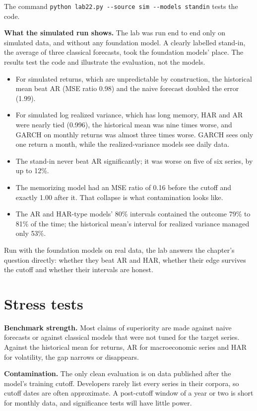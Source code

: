 The command \texttt{python lab22.py -{}-source sim -{}-models standin} tests the code.

\textbf{What the simulated run shows.} The lab was run end to end only on simulated data, and without any foundation model. A clearly labelled stand-in, the average of three classical forecasts, took the foundation models' place. The results test the code and illustrate the evaluation, not the models.

\begin{itemize}
  \item For simulated returns, which are unpredictable by construction, the historical mean beat AR (MSE ratio 0.98) and the naive forecast doubled the error (1.99).
  \item For simulated log realized variance, which has long memory, HAR and AR were nearly tied (0.996), the historical mean was nine times worse, and GARCH on monthly returns was almost three times worse. GARCH sees only one return a month, while the realized-variance models see daily data.
  \item The stand-in never beat AR significantly; it was worse on five of six series, by up to 12\%.
  \item The memorizing model had an MSE ratio of 0.16 before the cutoff and exactly 1.00 after it. That collapse is what contamination looks like.
  \item The AR and HAR-type models' 80\% intervals contained the outcome 79\% to 81\% of the time; the historical mean's interval for realized variance managed only 53\%.
\end{itemize}

Run with the foundation models on real data, the lab answers the chapter's question directly: whether they beat AR and HAR, whether their edge survives the cutoff and whether their intervals are honest.

\section{Stress tests}
\label{sec:22-stress}

\textbf{Benchmark strength.} Most claims of superiority are made against naive forecasts or against classical models that were not tuned for the target series. Against the historical mean for returns, AR for macroeconomic series and HAR for volatility, the gap narrows or disappears.

\textbf{Contamination.} The only clean evaluation is on data published after the model's training cutoff. Developers rarely list every series in their corpora, so cutoff dates are often approximate. A post-cutoff window of a year or two is short for monthly data, and significance tests will have little power.


